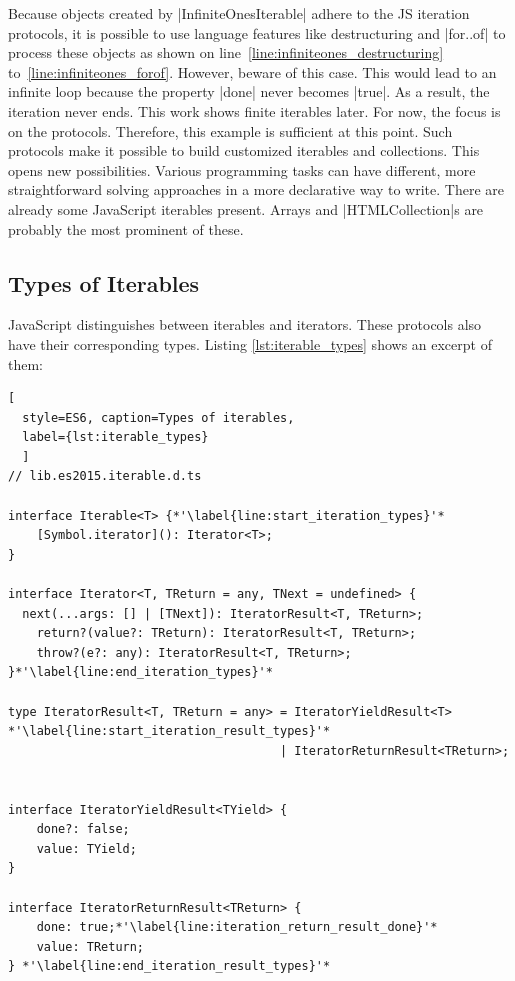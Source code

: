 Because objects created by |InfiniteOnesIterable| adhere to the JS iteration
protocols, it is possible to use language features like destructuring and |for..of| 
to process these objects as shown on line~\ref{line:infiniteones_destructuring} to~\ref{line:infiniteones_forof}.
However, beware of this case. This would lead to an infinite loop because the
property |done| never becomes |true|. As a result, the iteration never ends. This
work shows finite iterables later. For now, the focus is on the protocols.
Therefore, this example is sufficient at this point.
\newline
Such protocols make it possible to build customized iterables and
collections. This opens new possibilities. Various programming tasks can have 
different, more straightforward solving approaches in a more declarative way to
write.
There are already some JavaScript iterables present. Arrays and
|HTMLCollection|s are probably the most prominent of these.

\subsection{Types of Iterables}
\label{sub:Types of Iterables}
JavaScript distinguishes between iterables and iterators. These
protocols also have their corresponding types. Listing \ref{lst:iterable_types}
shows an excerpt of them:

\begin{lstlisting}[
  style=ES6, caption=Types of iterables,
  label={lst:iterable_types}
  ]
// lib.es2015.iterable.d.ts

interface Iterable<T> {*'\label{line:start_iteration_types}'*
    [Symbol.iterator](): Iterator<T>;
}

interface Iterator<T, TReturn = any, TNext = undefined> {
  next(...args: [] | [TNext]): IteratorResult<T, TReturn>;
    return?(value?: TReturn): IteratorResult<T, TReturn>;
    throw?(e?: any): IteratorResult<T, TReturn>;
}*'\label{line:end_iteration_types}'*

type IteratorResult<T, TReturn = any> = IteratorYieldResult<T> *'\label{line:start_iteration_result_types}'*
                                      | IteratorReturnResult<TReturn>;


interface IteratorYieldResult<TYield> {
    done?: false;
    value: TYield;
}

interface IteratorReturnResult<TReturn> {
    done: true;*'\label{line:iteration_return_result_done}'*
    value: TReturn;
} *'\label{line:end_iteration_result_types}'*
\end{lstlisting}

